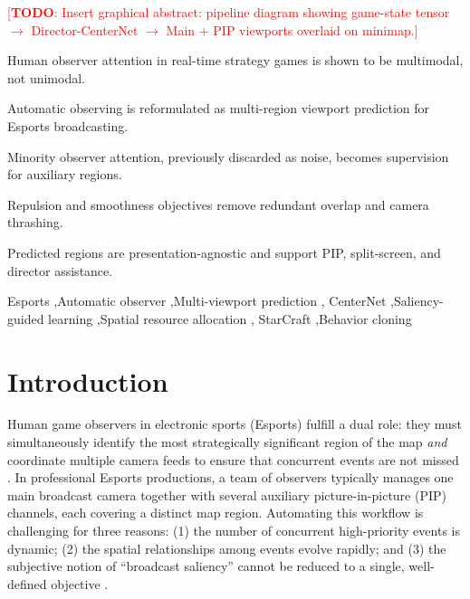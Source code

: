 \documentclass[preprint,12pt]{elsarticle}
\newcommand{\todo}[1]{\textcolor{red}{[\textbf{TODO}: #1]}}
\begin{document}
\begin{frontmatter}
\begin{graphicalabstract}
\todo{Insert graphical abstract: pipeline diagram showing game-state tensor
$\rightarrow$ Director-CenterNet $\rightarrow$ Main + PIP viewports overlaid
on minimap.}
\end{graphicalabstract}

\begin{highlights}
\item Human observer attention in real-time strategy games is shown to be
      multimodal, not unimodal.
\item Automatic observing is reformulated as multi-region viewport prediction
      for Esports broadcasting.
\item Minority observer attention, previously discarded as noise, becomes
      supervision for auxiliary regions.
\item Repulsion and smoothness objectives remove redundant overlap and camera
      thrashing.
\item Predicted regions are presentation-agnostic and support PIP,
      split-screen, and director assistance.
\end{highlights}

\begin{keyword}
Esports \sep Automatic observer \sep Multi-viewport prediction \sep
CenterNet \sep Saliency-guided learning \sep Spatial resource allocation \sep
StarCraft \sep Behavior cloning
\end{keyword}

\end{frontmatter}


\section{Introduction}
\label{sec:intro}

Human game observers in electronic sports (Esports) fulfill a dual role: 
they must simultaneously identify the most strategically significant region 
of the map \emph{and} coordinate multiple camera feeds to ensure that 
concurrent events are not missed \cite{joo2023learning}. In professional 
Esports productions, a team of observers typically manages one main broadcast 
camera together with several auxiliary picture-in-picture (PIP) channels, each 
covering a distinct map region. Automating this workflow is challenging for 
three reasons: (1) the number of concurrent high-priority events is dynamic; 
(2) the spatial relationships among events evolve rapidly; and (3) the 
subjective notion of ``broadcast saliency'' cannot be reduced to a single, 
well-defined objective \cite{bae2025observer}.
\end{document}
